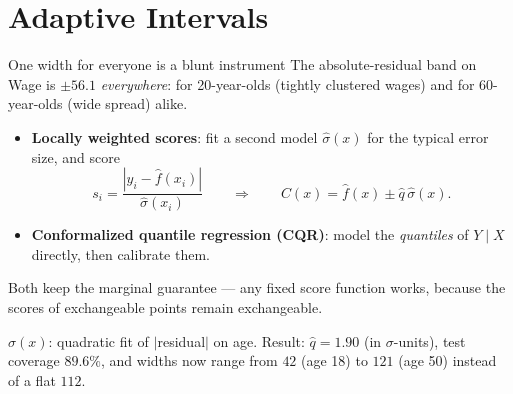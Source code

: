 \documentclass[aspectratio=169,11pt]{beamer}
\begin{document}
\section{Adaptive Intervals}

\begin{frame}{One width for everyone is a blunt instrument}
  The absolute-residual band on Wage is $\pm 56.1$ \emph{everywhere}: for 20-year-olds
  (tightly clustered wages) and for 60-year-olds (wide spread) alike.
  \begin{readme}
    \begin{itemize}
      \item \textbf{Locally weighted scores}: fit a second model
            $\hat\sigma(x)$ for the typical error size, and score
            \[
              s_i = \frac{|y_i - \hat f(x_i)|}{\hat\sigma(x_i)}
              \qquad\Longrightarrow\qquad
              C(x) = \hat f(x) \pm \hat q\, \hat\sigma(x).
            \]
      \item \textbf{Conformalized quantile regression (CQR)}: model the
            \emph{quantiles} of $Y \mid X$ directly, then calibrate them.
    \end{itemize}
    Both keep the marginal guarantee --- any fixed score function works, because the
    scores of exchangeable points remain exchangeable.
  \end{readme}
  \begin{numexample}
    $\hat\sigma(x)$: quadratic fit of $|$residual$|$ on age. Result:
    $\hat q = 1.90$ (in $\sigma$-units), test coverage $89.6\%$, and widths now range
    from $42$ (age 18) to $121$ (age 50) instead of a flat $112$.
  \end{numexample}
\end{frame}
\end{document}
